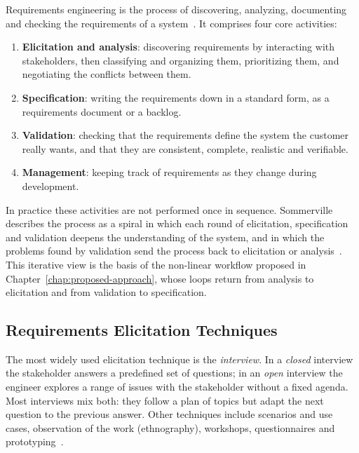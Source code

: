 Requirements engineering is the process of discovering, analyzing, documenting and checking the requirements of a system~\cite{sommerville2015software, pohl2010requirements}. It comprises four core activities:
\begin{enumerate}
    \item \textbf{Elicitation and analysis}: discovering requirements by interacting with stakeholders, then classifying and organizing them, prioritizing them, and negotiating the conflicts between them.
    \item \textbf{Specification}: writing the requirements down in a standard form, as a requirements document or a backlog.
    \item \textbf{Validation}: checking that the requirements define the system the customer really wants, and that they are consistent, complete, realistic and verifiable.
    \item \textbf{Management}: keeping track of requirements as they change during development.
\end{enumerate}

In practice these activities are not performed once in sequence. Sommerville describes the process as a spiral in which each round of elicitation, specification and validation deepens the understanding of the system, and in which the problems found by validation send the process back to elicitation or analysis~\cite{sommerville2015software}. This iterative view is the basis of the non-linear workflow proposed in Chapter~\ref{chap:proposed-approach}, whose loops return from analysis to elicitation and from validation to specification.

\subsection{Requirements Elicitation Techniques}
\label{sec:bg-elicitation}

The most widely used elicitation technique is the \emph{interview}. In a \emph{closed} interview the stakeholder answers a predefined set of questions; in an \emph{open} interview the engineer explores a range of issues with the stakeholder without a fixed agenda. Most interviews mix both: they follow a plan of topics but adapt the next question to the previous answer. Other techniques include scenarios and use cases, observation of the work (ethnography), workshops, questionnaires and prototyping~\cite{pohl2010requirements}.

